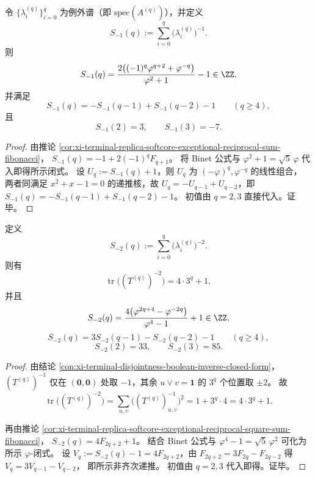 \begin{conclusion}[例外谱负一次幂和的显式闭式与递推]\label{con:xi-terminal-replica-softcore-exceptional-neg1-closed-recurrence}
令 \(\{\lambda_i^{(q)}\}_{i=0}^{q}\) 为例外谱（即 \(\mathrm{spec}(A^{(q)})\)），并定义
\[
S_{-1}(q):=\sum_{i=0}^{q}\bigl(\lambda_i^{(q)}\bigr)^{-1}.
\]
则
\[
S_{-1}(q)=\frac{2\bigl((-1)^q\varphi^{q+2}+\varphi^{-q}\bigr)}{\varphi^2+1}-1\in\ZZ,
\]
并满足
\[
S_{-1}(q)=-S_{-1}(q-1)+S_{-1}(q-2)-1\qquad(q\ge 4),
\]
且
\[
S_{-1}(2)=3,\qquad S_{-1}(3)=-7.
\]
\end{conclusion}
\begin{proof}
由推论 \ref{cor:xi-terminal-replica-softcore-exceptional-reciprocal-sum-fibonacci}，
\(
S_{-1}(q)=-1+2(-1)^qF_{q+1}
\)。
将 Binet 公式与 \(\varphi^2+1=\sqrt5\,\varphi\) 代入即得所示闭式。
设 \(U_q:=S_{-1}(q)+1\)，则 \(U_q\) 为 \((-\varphi)^q,\varphi^{-q}\) 的线性组合，
两者同满足 \(x^2+x-1=0\) 的递推核，故
\(
U_q=-U_{q-1}+U_{q-2}
\)，即
\(
S_{-1}(q)=-S_{-1}(q-1)+S_{-1}(q-2)-1
\)。
初值由 \(q=2,3\) 直接代入。证毕。
\end{proof}

\begin{conclusion}[全逆平方迹与例外谱负二次幂和]\label{con:xi-terminal-replica-softcore-exceptional-neg2-trace-closed-recurrence}
定义
\[
S_{-2}(q):=\sum_{i=0}^{q}\bigl(\lambda_i^{(q)}\bigr)^{-2}.
\]
则有
\[
\operatorname{tr}\bigl((T^{(q)})^{-2}\bigr)=4\cdot 3^q+1,
\]
并且
\[
S_{-2}(q)=\frac{4\bigl(\varphi^{2q+4}-\varphi^{-2q}\bigr)}{\varphi^4-1}+1\in\ZZ,
\]
\[
S_{-2}(q)=3S_{-2}(q-1)-S_{-2}(q-2)-1\qquad(q\ge 4),
\]
\[
S_{-2}(2)=33,\qquad S_{-2}(3)=85.
\]
\end{conclusion}
\begin{proof}
由结论 \ref{con:xi-terminal-disjointness-boolean-inverse-closed-form}，
\((T^{(q)})^{-1}\) 仅在 \((\mathbf 0,\mathbf 0)\) 处取 \(-1\)，其余 \(u\vee v=\mathbf 1\) 的 \(3^q\) 个位置取 \(\pm2\)。
故
\[
\operatorname{tr}\bigl((T^{(q)})^{-2}\bigr)
=\sum_{u,v}\bigl((T^{(q)})^{-1}_{u,v}\bigr)^2
=1+3^q\cdot 4
=4\cdot 3^q+1.
\]
\par
再由推论 \ref{cor:xi-terminal-replica-softcore-exceptional-reciprocal-square-sum-fibonacci}，
\(
S_{-2}(q)=4F_{2q+2}+1
\)。
结合 Binet 公式与 \(\varphi^4-1=\sqrt5\,\varphi^2\) 可化为所示 \(\varphi\)-闭式。
设 \(V_q:=S_{-2}(q)-1=4F_{2q+2}\)，由 \(F_{2q+2}=3F_{2q}-F_{2q-2}\) 得
\(
V_q=3V_{q-1}-V_{q-2}
\)，
即所示非齐次递推。
初值由 \(q=2,3\) 代入即得。证毕。
\end{proof}

